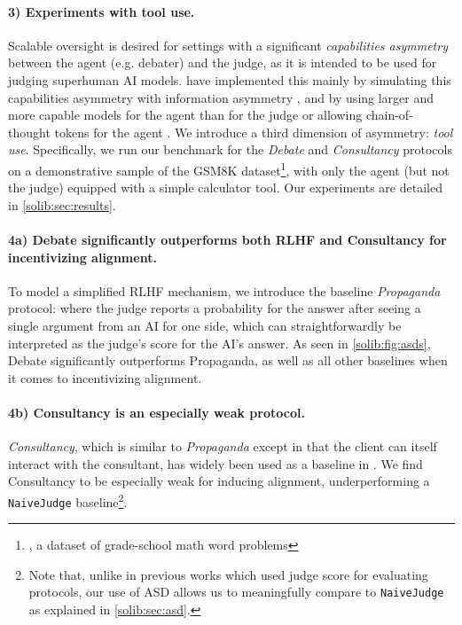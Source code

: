 \paragraph{3) Experiments with tool use.} Scalable oversight is desired for settings with a significant \emph{capabilities asymmetry} between the agent (e.g. debater) and the judge, as it is intended to be used for judging superhuman AI models. \Previouswork{} have implemented this mainly by simulating this capabilities asymmetry with information asymmetry \citep{radhakrishnanAnthropicFall20232023,khanDebatingMorePersuasive2024}, and by using larger and more capable models for the agent than for the judge or allowing chain-of-thought tokens for the agent \citep{kentonScalableOversightWeak2024}. We introduce a third dimension of asymmetry: \emph{tool use}. Specifically, we run our benchmark for the \emph{Debate} and \emph{Consultancy} protocols on a demonstrative sample of the GSM8K dataset\footnote{\citet{cobbe2021gsm8k}, a dataset of grade-school math word problems}, with only the agent (but not the judge) equipped with a simple calculator tool. Our experiments are detailed in \cref{solib:sec:results}.

\paragraph{4a) Debate significantly outperforms both RLHF and Consultancy for incentivizing alignment.} To model a simplified RLHF mechanism, we introduce the baseline \emph{Propaganda} protocol: where the judge reports a probability for the answer after seeing a single argument from an AI for one side, which can straightforwardly be interpreted as the judge's score for the AI's answer. As seen in \cref{solib:fig:asds}, Debate significantly outperforms Propaganda, as well as all other baselines when it comes to incentivizing alignment. %

\paragraph{4b) Consultancy is an especially weak protocol.} \emph{Consultancy}, which is similar to \emph{Propaganda} except in that the client can itself interact with the consultant, has widely been used as a baseline in \previouswork{}. We find Consultancy to be especially weak for inducing alignment, underperforming a \texttt{NaiveJudge} baseline\footnote{Note that, unlike in previous works which used judge score for evaluating protocols, our use of ASD allows us to meaningfully compare to \texttt{NaiveJudge} as explained in \cref{solib:sec:asd}.}.

